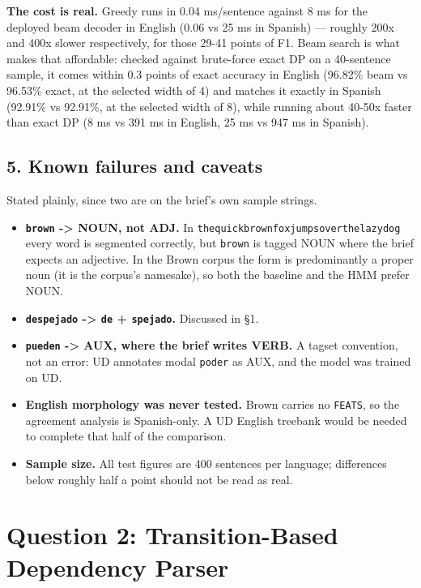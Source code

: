 \documentclass[11pt,a4paper]{article}
\begin{document}
\textbf{The cost is real.} Greedy runs in 0.04 ms/sentence against 8 ms for the deployed beam decoder in English (0.06 vs 25 ms in Spanish) --- roughly 200x and 400x slower respectively, for those 29-41 points of F1. Beam search is what makes that affordable: checked against brute-force exact DP on a 40-sentence sample, it comes within 0.3 points of exact accuracy in English (96.82\% beam vs 96.53\% exact, at the selected width of 4) and matches it exactly in Spanish (92.91\% vs 92.91\%, at the selected width of 8), while running about 40-50x faster than exact DP (8 ms vs 391 ms in English, 25 ms vs 947 ms in Spanish).

\subsection*{5. Known failures and caveats}

Stated plainly, since two are on the brief's own sample strings.

\begin{itemize}
\item \textbf{\texttt{brown} -> NOUN, not ADJ.} In \texttt{thequickbrownfoxjumpsoverthelazydog} every word is segmented correctly, but \texttt{brown} is tagged NOUN where the brief expects an adjective. In the Brown corpus the form is predominantly a proper noun (it is the corpus's namesake), so both the baseline and the HMM prefer NOUN.
\item \textbf{\texttt{despejado} -> \texttt{de} + \texttt{spejado}.} Discussed in \S{}1.
\item \textbf{\texttt{pueden} -> AUX, where the brief writes VERB.} A tagset convention, not an error: UD annotates modal \texttt{poder} as AUX, and the model was trained on UD.
\item \textbf{English morphology was never tested.} Brown carries no \texttt{FEATS}, so the agreement analysis is Spanish-only. A UD English treebank would be needed to complete that half of the comparison.
\item \textbf{Sample size.} All test figures are 400 sentences per language; differences below roughly half a point should not be read as real.
\end{itemize}

\clearpage
\section*{Question 2: Transition-Based Dependency Parser}
\end{document}
